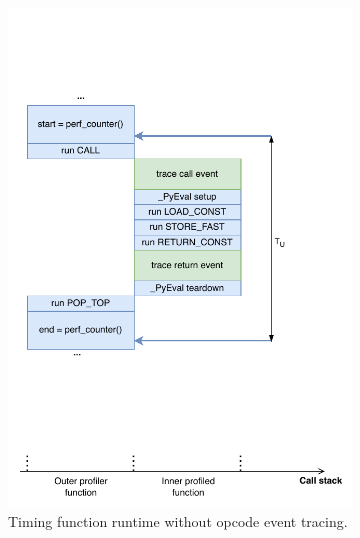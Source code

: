 \begin{figure}[H]
    \centering
    \begin{subfigure}[b]{0.45\textwidth}
       \centering
       \includegraphics[width=\textwidth]{images/profiling_bytecode/untraced_run.drawio.pdf}
       \caption{Timing function runtime without opcode event tracing.}
       \vspace{1em}
       \label{figure:profiler-untraced-run}
    \end{subfigure}
    \hfill
    \begin{subfigure}[b]{0.45\textwidth}
       \centering

\end{subfigure}
\end{figure}
